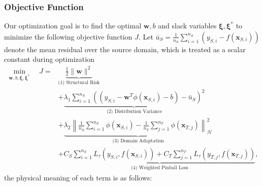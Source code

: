 \documentclass[a4paper]{cas-sc}
\begin{document}
\subsubsection{Objective Function}
Our optimization goal is to find the optimal $\boldsymbol{w}, b$ and slack variables $\boldsymbol{\xi}, \boldsymbol{\xi}^*$ to minimize the following objective function $J$. Let $\bar{u}_S = \frac{1}{n_S}\sum_{i=1}^{n_S}(y_{S,i} - f(\boldsymbol{x}_{S,i}))$ denote the mean residual over the source domain, which is treated as a scalar constant during optimization
\begin{equation}
\label{eq:objective}
\begin{aligned}
\min_{\boldsymbol{w}, b, \boldsymbol{\xi}, \boldsymbol{\xi}^*} \quad J = & \underbrace{\frac{1}{2} \|\boldsymbol{w}\|^2}_{\text{(1) Structural Risk}} \\
& + \underbrace{\lambda_1 \sum_{i=1}^{n_S} \left( (y_{S,i} - \boldsymbol{w}^T\phi(\boldsymbol{x}_{S,i}) - b) - \bar{u}_S \right)^2}_{\text{(2) Distribution Variance}} \\
& + \underbrace{\lambda_2 \left\| \frac{1}{n_S} \sum_{i=1}^{n_S} \phi(\boldsymbol{x}_{S,i}) - \frac{1}{n_T} \sum_{j=1}^{n_T} \phi(\boldsymbol{x}_{T,j}) \right\|_{\mathcal{H}}^2}_{\text{(3) Domain Adaptation}} \\
& + \underbrace{C_S \sum_{i=1}^{n_S} L_{\tau}(y_{S,i}, f(\boldsymbol{x}_{S,i})) + C_T \sum_{j=1}^{n_T} L_{\tau}(y_{T,j}, f(\boldsymbol{x}_{T,j}))}_{\text{(4) Weighted Pinball Loss}},
\end{aligned}
\end{equation}
the physical meaning of each term is as follows:
\end{document}
